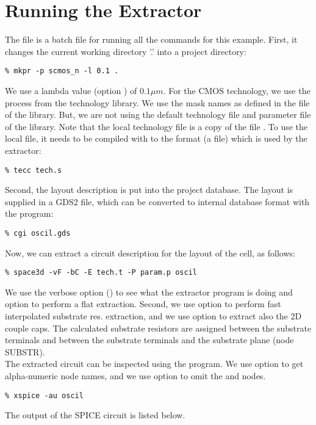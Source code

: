 \section{Running the Extractor}
The file  is a batch file for running all the commands for this example.
First, it changes the current working directory '.' into a project directory:
\small
\begin{Verbatim}
% mkpr -p scmos_n -l 0.1 .
\end{Verbatim}
\normalsize
We use a lambda value (option ) of $0.1 \mu m$.
For the CMOS technology, we use the  process from the technology library.
We use the mask names as defined in the  file of the library.
But, we are not using the default technology
file  and parameter file  of the library.
Note that the local technology file  is a copy of the file .
To use the local file, it needs to be compiled with  to the format
(a  file) which is used by the extractor:
\small
\begin{Verbatim}
% tecc tech.s
\end{Verbatim}
\normalsize
Second, the layout description is put into the project database.
The layout is supplied in a GDS2 file, which can be converted to
internal database format with the  program:
\small
\begin{Verbatim}
% cgi oscil.gds
\end{Verbatim}
\normalsize
Now, we can extract a circuit description for the layout of the  cell, as follows:
\small
\begin{Verbatim}
% space3d -vF -bC -E tech.t -P param.p oscil
\end{Verbatim}
\normalsize
We use the verbose option () to see what the extractor program is doing
and option  to perform a flat extraction.
Second, we use option  to perform fast interpolated substrate res. extraction,
and we use option  to extract also the 2D couple caps.
The calculated substrate resistors are assigned between the substrate terminals and between the substrate
terminals and the substrate plane (node SUBSTR).
\\[1 ex]
The extracted circuit can be inspected using the  program.
We use option  to get alpha-numeric node names,
and we use option  to omit the  and  nodes.
\small
\begin{Verbatim}
% xspice -au oscil
\end{Verbatim}
\normalsize
The output of the SPICE circuit is listed below.

